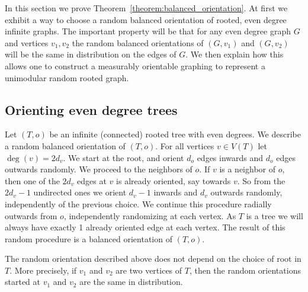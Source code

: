 In this section we prove Theorem~\ref{theorem:balanced_orientation}. At first we exhibit a way to choose a random balanced orientation of rooted, even degree infinite graphs. The important property will be that for any even degree graph $G$ and vertices $v_1, v_2$ the random balanced orientations of $(G, v_1)$ and $(G,v_2)$ will be the same in distribution on the edges of $G$. We then explain how this allows one to construct a measurably orientable graphing to represent a unimodular random rooted graph.

\subsection{Orienting even degree trees} \label{subsection:orienting_trees}
Let $(T,o)$ be an infinite (connected) rooted tree with even degrees. We describe a random balanced orientation of $(T,o)$. For all vertices $v \in V(T)$ let $\deg(v)=2d_v$. We start at the root, and orient $d_o$ edges inwards and $d_o$ edges outwards randomly. We proceed to the neighbors of $o$. If $v$ is a neighbor of $o$, then one of the $2 d_v$ edges at $v$ is already oriented, say towards $v$. So from the $2d_v-1$ undirected ones we orient $d_v-1$ inwards and $d_v$ outwards randomly, independently of the previous choice. We continue this procedure radially outwards from $o$, independently randomizing at each vertex. As $T$ is a tree we will always have exactly 1 already oriented edge at each vertex. The result of this random procedure is a balanced orientation of $(T,o)$.

\begin{lemm}
The random orientation described above does not depend on the choice of root in $T$. More precisely, if $v_1$ and $v_2$ are two vertices of $T$, then the random orientations started at $v_1$ and $v_2$ are the same in distribution.
\end{lemm}

